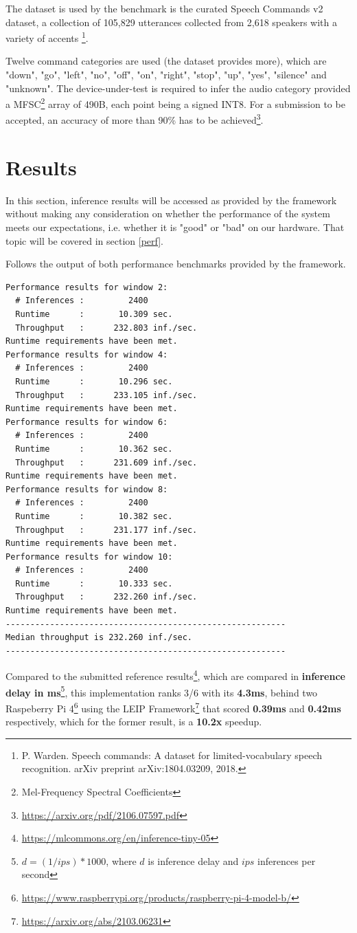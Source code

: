 \documentclass{article}
\begin{document}
The dataset is used by the benchmark is the curated Speech Commands v2 dataset, a collection of 105,829 utterances collected from 2,618 speakers with a variety of accents \footnote{P. Warden. Speech commands: A dataset for limited-vocabulary speech recognition. arXiv preprint arXiv:1804.03209, 2018.}.

Twelve command categories are used (the dataset provides more), which are "down", "go", "left", "no", "off", "on", "right", "stop", "up", "yes", "silence" and "unknown". The device-under-test is required to infer the audio category provided a MFSC\footnote{Mel-Frequency Spectral Coefficients} array of 490B, each point being a signed INT8. For a submission to be accepted, an accuracy of more than 90\% has to be achieved\footnote{\url{https://arxiv.org/pdf/2106.07597.pdf}}.

\section{Results}\label{got}
In this section, inference results will be accessed as provided by the framework without making any consideration on whether the performance of the system meets our expectations, i.e. whether it is "good" or "bad" on our hardware. That topic will be covered in section \ref{perf}.

Follows the output of both performance benchmarks provided by the framework.

\begin{lstlisting}[caption=Median Performance Result]
Performance results for window 2:
  # Inferences :         2400
  Runtime      :       10.309 sec.
  Throughput   :      232.803 inf./sec.
Runtime requirements have been met.
Performance results for window 4:
  # Inferences :         2400
  Runtime      :       10.296 sec.
  Throughput   :      233.105 inf./sec.
Runtime requirements have been met.
Performance results for window 6:
  # Inferences :         2400
  Runtime      :       10.362 sec.
  Throughput   :      231.609 inf./sec.
Runtime requirements have been met.
Performance results for window 8:
  # Inferences :         2400
  Runtime      :       10.382 sec.
  Throughput   :      231.177 inf./sec.
Runtime requirements have been met.
Performance results for window 10:
  # Inferences :         2400
  Runtime      :       10.333 sec.
  Throughput   :      232.260 inf./sec.
Runtime requirements have been met.
---------------------------------------------------------
Median throughput is 232.260 inf./sec.
---------------------------------------------------------
\end{lstlisting}\label{lst:perf}
Compared to the submitted reference results\footnote{\url{https://mlcommons.org/en/inference-tiny-05}}, which are compared in \textbf{inference delay in ms}\footnote{\(d = (1 / ips) * 1000\), where \(d\) is inference delay and \(ips\) inferences per second}, this implementation ranks 3/6 with its \textbf{4.3ms}, behind two Raspeberry Pi 4\footnote{\url{https://www.raspberrypi.org/products/raspberry-pi-4-model-b/}} using the LEIP Framework\footnote{\url{https://arxiv.org/abs/2103.06231}} that scored \textbf{0.39ms} and \textbf{0.42ms} respectively, which for the former result, is a \textbf{10.2x} speedup.
\end{document}
